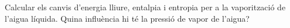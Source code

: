 \begin{exr}
Calcular els canvis d'energia lliure, entalpia i entropia per a la vaporització de l'aigua líquida. Quina influència hi té la pressió de vapor de l'aigua?
\end{exr}